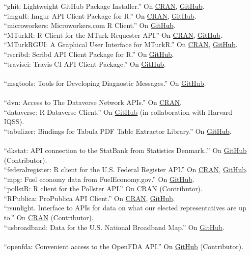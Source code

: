 \documentclass[12pt]{article}
\newcommand{\topic}[1]{\pagebreak[3]\indent {\color{lg}{\footnotesize #1 }}\\}
\newcommand{\entry}[1]{\indent {\color{lg}\guillemotright}\hspace{2pt}#1\vspace{.25em}\\}
\begin{document}
	\entry{``ghit: Lightweight GitHub Package Installer.'' On \href{https://cran.r-project.org/package=ghit}{CRAN}, \href{https://github.com/cloudyr/ghit}{GitHub}.}
	\entry{``imguR: Imgur API Client Package for R.'' On \href{https://cran.r-project.org/package=imguR}{CRAN}, \href{https://github.com/cloudyr/imguR}{GitHub}.}
	\entry{``microworkers: Microworkers.com R Client.'' On \href{https://github.com/cloudyr/microworkers}{GitHub}.}
	\entry{``MTurkR: R Client for the MTurk Requester API.'' On \href{https://cran.r-project.org/package=MTurkR}{CRAN}, \href{https://github.com/leeper/MTurkR}{GitHub}.}
	\entry{``MTurkRGUI: A Graphical User Interface for MTurkR.'' On \href{https://cran.r-project.org/package=MTurkRGUI}{CRAN}, \href{https://github.com/leeper/MTurkRGUI}{GitHub}.}
	\entry{``rscribd: Scribd API Client Package for R.'' On \href{https://github.com/cloudyr/rscribd}{GitHub}.}
	\entry{``travisci: Travis-CI API Client Package.'' On \href{https://github.com/cloudyr/travisci}{GitHub}.}

	\topic{R packages contributed to RL10N}
	\entry{``msgtools: Tools for Developing Diagnostic Messages.'' On \href{https://github.com/RL10N/msgtools}{GitHub}.}

	\topic{R packages contributed to the rOpenSci project}
	\entry{``dvn: Access to The Dataverse Network APIs.'' On \href{https://cran.r-project.org/package=dvn}{CRAN}.}
	\entry{``dataverse: R Dataverse Client.'' On \href{https://github.com/iqss/dataverse-client-r}{GitHub} (in collaboration with Harvard--IQSS).}
	\entry{``tabulizer: Bindings for Tabula PDF Table Extractor Library.'' On \href{https://github.com/ropensci/tabulizer}{GitHub}.}

	\topic{R packages contributed to the rOpenGov project}
	\entry{``dkstat: API connection to the StatBank from Statistics Denmark..'' On \href{https://github.com/rOpenGov/dkstat}{GitHub} (Contributor).}
	\entry{``federalregister: R client for the U.S. Federal Register API.'' On \href{https://cran.r-project.org/package=federalregister}{CRAN}, \href{https://github.com/rOpenGov/federalregister}{GitHub}.}
	\entry{``mpg: Fuel economy data from FuelEconomy.gov.'' On \href{https://github.com/rOpenGov/mpg}{GitHub}.}
	\entry{``pollstR: R client for the Pollster API.'' On \href{https://cran.r-project.org/package=pollstR}{CRAN} (Contributor).}
	\entry{``RPublica: ProPublica API Client.'' On \href{https://cran.r-project.org/package=RPublica}{CRAN}, \href{https://github.com/rOpenGov/RPublica}{GitHub}.}
	\entry{``rsunlight. Interface to APIs for data on what our elected representatives are up to.'' On \href{https://cran.r-project.org/package=rsunlight}{CRAN} (Contributor).}
	\entry{``usbroadband: Data for the U.S. National Broadband Map.'' On \href{https://github.com/rOpenGov/usbroadband}{GitHub}.}
\topic{R packages contributed to the rOpenHealth project}
	\entry{``openfda: Convenient access to the OpenFDA API.'' On \href{https://github.com/ropenhealth/openfda}{GitHub} (Contributor).}
\end{document}
